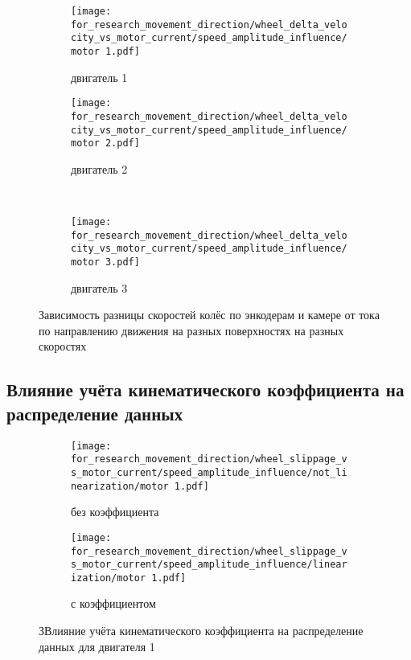 \begin{figure}[H]
    \centering
    \begin{subfigure}{0.49\textwidth}
        \centering
        \texttt{[image: for\_research\_movement\_direction/wheel\_delta\_velocity\_vs\_motor\_current/speed\_amplitude\_influence/motor 1.pdf]}
        \caption{двигатель 1}
    \end{subfigure}
    \hspace{0.005\textwidth}
    \begin{subfigure}{0.49\textwidth}
        \centering
        \texttt{[image: for\_research\_movement\_direction/wheel\_delta\_velocity\_vs\_motor\_current/speed\_amplitude\_influence/motor 2.pdf]}
        \caption{двигатель 2}
    \end{subfigure} \\
    \vspace{4pt}
    \centering
    \begin{subfigure}{0.49\textwidth}
        \centering
        \texttt{[image: for\_research\_movement\_direction/wheel\_delta\_velocity\_vs\_motor\_current/speed\_amplitude\_influence/motor 3.pdf]}
        \caption{двигатель 3}
    \end{subfigure}
    \caption{Зависимость разницы скоростей колёс по энкодерам и камере от тока по направлению движения на разных поверхностях на разных скоростях}
\end{figure}

\subsection{Влияние учёта кинематического коэффициента на распределение данных}

\begin{figure}[H]
    \centering
    \begin{subfigure}{0.49\textwidth}
        \centering
        \texttt{[image: for\_research\_movement\_direction/wheel\_slippage\_vs\_motor\_current/speed\_amplitude\_influence/not\_linearization/motor 1.pdf]}
        \caption{без коэффициента}
    \end{subfigure}
    \hspace{0.005\textwidth}
    \begin{subfigure}{0.49\textwidth}
        \centering
        \texttt{[image: for\_research\_movement\_direction/wheel\_slippage\_vs\_motor\_current/speed\_amplitude\_influence/linearization/motor 1.pdf]}
        \caption{с коэффициентом}
    \end{subfigure}
    \caption{ЗВлияние учёта кинематического коэффициента на распределение данных для двигателя 1}
\end{figure}


